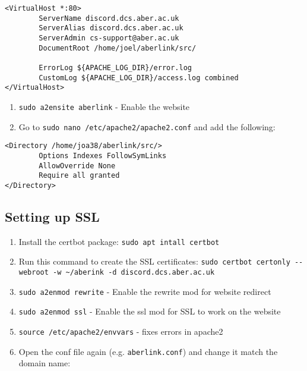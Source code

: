 \begin{lstlisting}
<VirtualHost *:80>
        ServerName discord.dcs.aber.ac.uk
        ServerAlias discord.dcs.aber.ac.uk
        ServerAdmin cs-support@aber.ac.uk
        DocumentRoot /home/joel/aberlink/src/

        ErrorLog ${APACHE_LOG_DIR}/error.log
        CustomLog ${APACHE_LOG_DIR}/access.log combined
</VirtualHost>
\end{lstlisting}

\begin{enumerate}
\def\labelenumi{\arabic{enumi}.}
\setcounter{enumi}{6}
\item
  \texttt{sudo a2ensite aberlink} - Enable the website
\item
  Go to \texttt{sudo nano /etc/apache2/apache2.conf} and add the
  following:
\end{enumerate}

\begin{lstlisting}
<Directory /home/joa38/aberlink/src/>
        Options Indexes FollowSymLinks
        AllowOverride None
        Require all granted
</Directory>
\end{lstlisting}

\subsection{Setting up SSL}\label{setting-up-ssl}

\begin{enumerate}
\def\labelenumi{\arabic{enumi}.}
\item
  Install the certbot package: \texttt{sudo apt intall certbot}
\item
  Run this command to create the SSL certificates:
  \texttt{sudo certbot certonly -{}-webroot -w \textasciitilde{}/aberink -d discord.dcs.aber.ac.uk}
\item
  \texttt{sudo a2enmod rewrite} - Enable the rewrite mod for website
  redirect
\item
  \texttt{sudo a2enmod ssl} - Enable the ssl mod for SSL to work on the
  website
\item
  \texttt{source /etc/apache2/envvars} - fixes errors in apache2
\item
  Open the conf file again (e.g. \texttt{aberlink.conf}) and change it
  match the domain name:
\end{enumerate}

